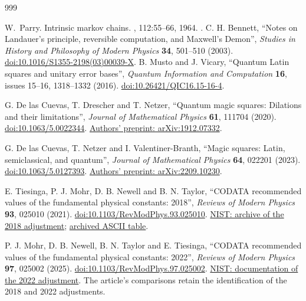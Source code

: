 \begin{thebibliography}{999}

W.~Parry.
\newblock Intrinsic markov chains.
, 112:55--66,
  1964.
\newblock \href {https://doi.org/10.1090/S0002-9947-1964-0161372-1}
  {}.
 C. H. Bennett, ``Notes on Landauer's principle,
reversible computation, and Maxwell's Demon'', \emph{Studies in History
and Philosophy of Modern Physics} \textbf{34}, 501--510 (2003).
\href{https://doi.org/10.1016/S1355-2198(03)00039-X}{doi:10.1016/S1355-2198(03)00039-X}.
B. Musto and J. Vicary,
``Quantum Latin squares and unitary error bases'',
\emph{Quantum Information and Computation} \textbf{16},
issues 15--16, 1318--1332 (2016).
\href{https://doi.org/10.26421/QIC16.15-16-4}{doi:10.26421/QIC16.15-16-4}.

G. De las Cuevas, T. Drescher and T. Netzer,
``Quantum magic squares: Dilations and their limitations'',
\emph{Journal of Mathematical Physics} \textbf{61}, 111704 (2020).
\href{https://doi.org/10.1063/5.0022344}{doi:10.1063/5.0022344}.
\href{https://arxiv.org/abs/1912.07332}{Authors' preprint: arXiv:1912.07332}.

G. De las Cuevas, T. Netzer and I. Valentiner-Branth,
``Magic squares: Latin, semiclassical, and quantum'',
\emph{Journal of Mathematical Physics} \textbf{64}, 022201 (2023).
\href{https://doi.org/10.1063/5.0127393}{doi:10.1063/5.0127393}.
\href{https://arxiv.org/abs/2209.10230}{Authors' preprint: arXiv:2209.10230}.

E. Tiesinga, P. J. Mohr, D. B. Newell and B. N. Taylor,
``CODATA recommended values of the fundamental physical constants: 2018'',
\emph{Reviews of Modern Physics} \textbf{93}, 025010 (2021).
\href{https://doi.org/10.1103/RevModPhys.93.025010}{doi:10.1103/RevModPhys.93.025010}.
\href{https://physics.nist.gov/cuu/Constants/archive2018.html}{NIST: archive of the 2018 adjustment};
\href{https://physics.nist.gov/cuu/Constants/ArchiveASCII/allascii_2018.txt}{archived ASCII table}.

P. J. Mohr, D. B. Newell, B. N. Taylor and E. Tiesinga,
``CODATA recommended values of the fundamental physical constants: 2022'',
\emph{Reviews of Modern Physics} \textbf{97}, 025002 (2025).
\href{https://doi.org/10.1103/RevModPhys.97.025002}{doi:10.1103/RevModPhys.97.025002}.
\href{https://physics.nist.gov/cuu/Constants/article2022.html}{NIST: documentation of the 2022 adjustment}.
The article's comparisons retain the identification of the 2018 and 2022 adjustments.


\end{thebibliography}
